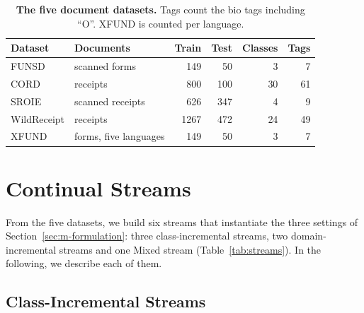 \begin{table}[!htbp]
  \centering
  \caption[The five document datasets]{\textbf{The five document datasets.} Tags count the
  \gls{bio} tags including ``O''. XFUND is counted per language.}
  \label{tab:datasets}
  \begin{tabular}{@{}llrrrr@{}}
    \toprule
    Dataset & Documents & Train & Test & Classes & Tags \\
    \midrule
    FUNSD & scanned forms & 149 & 50 & 3 & 7 \\
    CORD & receipts & 800 & 100 & 30 & 61 \\
    SROIE & scanned receipts & 626 & 347 & 4 & 9 \\
    WildReceipt & receipts & 1267 & 472 & 24 & 49 \\
    XFUND & forms, five languages & 149 & 50 & 3 & 7 \\
    \bottomrule
  \end{tabular}
\end{table}

\section{Continual Streams}
\label{sec:e-streams}

From the five datasets, we build six streams that instantiate the three settings of
Section~\ref{sec:m-formulation}: three class-incremental streams, two domain-incremental
streams and one Mixed stream (Table~\ref{tab:streams}). In the following, we describe each
of them.

\begin{table}[!htbp]
  \centering
  \caption[The six continual streams]{\textbf{The six continual streams.} Train/test:
  documents of the underlying datasets. AA: average accuracy; full-label F1: on the
  unmasked test set (Section~\ref{sec:m-formulation}).}
  \label{tab:streams}
  \resizebox{\textwidth}{!}{}
\end{table}

\subsection{Class-Incremental Streams}
\label{sec:e-cil}

